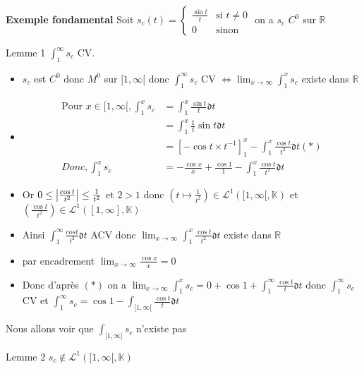 \documentclass[11pt,hidelinks]{book}
\theoremstyle{mytheoremstyle}
\theoremstyle{mytheoremstyle}
\theoremstyle{mytheoremstyle}
\theoremstyle{mytheoremstyle}
\theoremstyle{mytheoremstyle}
\theoremstyle{mytheoremstyle}
\theoremstyle{mytheoremstyle}
\theoremstyle{mytheoremstyle}
\theoremstyle{myproblemstyle}
\def\mbb#1{\mathbb{#1}}
\def\mfk#1{\mathfrak{#1}}
\def\mfc#1{\mathcal{#1}}
\def\bR{\mbb{R}}
\def\LI#1{\mfc{L}^1(#1,\bK)}
\def\bK{\mbb{K}}
\newcommand{\deq}[3]{\begin{cases}
    #1 & \text{si } #2 \\
    #3 & \text{sinon}
\end{cases}}
\begin{document}
\begin{adjustwidth}{-2em}{-1em}
    \begin{ex}
        \textbf{Exemple fondamental}
        Soit $s_c(t) = \deq{\frac{\sin t}{t}}{t \not= 0}{0}$ on a $s_c$ $C^0$ sur $\bR$
        \begin{rmq}{Lemme 1}
            $\int_{1}^{\infty} s_c$ CV.
            \begin{itemize}[label=$\cdot$]
                \item $s_c$ est $C^0$ donc $M^0$ sur $[1,\infty[$ donc $\int_{1}^{\infty} s_c$ CV $\Leftrightarrow \lim_{x\to\infty} \int_{1}^{x} s_c$ existe dans $\bR$ 
                \item \begin{align*} 
                    \text{Pour } x \in [1,\infty[, \int_{1}^{x} s_c &= \int_{1}^{x} \frac{\sin t}{t} \mfk{d}t \\ 
                                                                    &= \int_{1}^{x} \frac{1}{t} \sin t \mfk{d}t \\ 
                                                                    &= \left[-\cos t \times t^{-1}\right]^x_1 - \int_{1}^{x} \frac{\cos t}{t^2} \mfk{d}t (*) \\ 
                                            Donc, \int_{1}^{x} s_c  &= -\frac{\cos x}{x} + \frac{\cos 1}{1} - \int_{1}^{x} \frac{\cos t}{t^2} \mfk{d}t
                \end{align*}
                \item Or $0 \leq \abs{\frac{\cos t}{t^2}} \leq \frac{1}{t^2}$ et $2>1$ donc $\left(t \mapsto \frac{1}{t^2}\right) \in \LI{[1,\infty[}$ et $\left(\frac{\cos t}{t^2}\right) \in \LI{[1,\infty]}$
                \item Ainsi $\int_{1}^{\infty} \frac{cos t}{t^2} \mfk{d}t$ ACV donc $\lim_{x \to \infty} \int_{1}^{x} \frac{\cos t}{t^2} \mfk{d}t$ existe dans $\bR$
                \item par encadrement $\lim_{x \to \infty} \frac{\cos x}{x} = 0$ 
                \item Donc d'après $(*)$ on a $\lim_{x \to \infty} \int_{1}^{x} s_c = 0 + \cos 1 + \int_{1}^{\infty} \frac{\cos t}{t} \mfk{d}t$
                donc $\int_{1}^{\infty} s_c$ CV et $\int_{1}^{\infty} s_c = \cos 1 - \int_{[1,\infty[} \frac{\cos t}{t} \mfk{d}t$
             \end{itemize}
        \end{rmq}
        Nous allons voir que $\int_{[1,\infty[} s_c$ n'existe pas
        \begin{rmq}{Lemme 2}
            $s_c \not \in \LI{[1,\infty[}$ 

\end{rmq}
\end{ex}
\end{adjustwidth}
\end{document}
